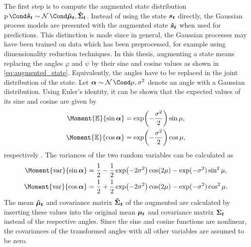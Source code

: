 The first step is to compute the augmented state distribution $\Prob{\rv{\hat{s}_t}} \sim \Gaussian{\mat{\hat{\mu}_t}, \mat{\hat{\Sigma}_t}}$.
Instead of using the state $\bm{s_t}$ directly, the Gaussian process models are presented with the augmented state $\bm{\hat{s}_t}$ when used for predictions.
This distinction is made since in general, the Gaussian processes may have been trained on data which has been preprocessed, for example using dimensionality reduction techniques.
In this thesis, augmenting a state means replacing the angles $\varphi$ and $\psi$ by their sine and cosine values as shown in \cref{eq:augmented_state}.
Equivalently, the angles have to be replaced in the joint distribution of the state.
Let $\rv{\alpha} \sim \Gaussian{\mu, \sigma^2}$ denote an angle with a Gaussian distribution.
Using Euler's identity, it can be shown that the expected values of its sine and cosine are given by
\begin{align}
    \begin{split}
        \Moment{\E}{\sin \rv{\alpha}} &= \exp\!\left( -\frac{\sigma^2}{2} \right)\sin\mu, \\
        \Moment{\E}{\cos \rv{\alpha}} &= \exp\!\left( -\frac{\sigma^2}{2} \right)\cos\mu,
    \end{split}
\end{align}
respectively \cite{deisenroth_efficient_2010}.
The variances of the two random variables can be calculated as
\begin{align}
    \begin{split}
        \Moment{\var}{\sin \rv{\alpha}} &= \frac{1}{2} - \frac{1}{2} \exp\!\left( -2 \sigma^2 \right) \cos(2\mu) - \exp(- \sigma^2) \sin^2\mu, \\
        \Moment{\var}{\cos \rv{\alpha}} &= \frac{1}{2} + \frac{1}{2} \exp\!\left( -2 \sigma^2 \right) \cos(2\mu) - \exp(- \sigma^2) \cos^2\mu.
    \end{split}
\end{align}
The mean $\bm{\hat{\mu}_t}$ and covariance matrix $\bm{\hat{\Sigma}_t}$ of the augmented are calculated by inserting these values into the original mean $\bm{\mu_t}$ and covariance matrix $\bm{\Sigma_t}$ instead of the respective angles.
Since the sine and cosine functions are nonlinear, the covariances of the transformed angles with all other variables are assumed to be zero.

